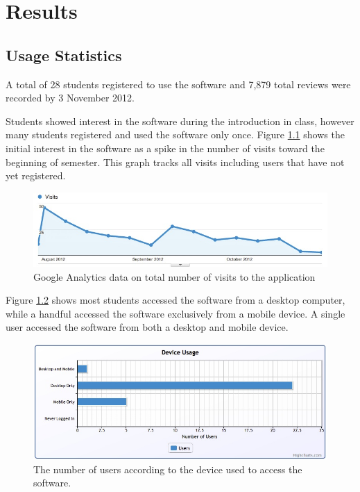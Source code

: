 \chapter{Results}

\section{Usage Statistics}

A total of 28 students registered to use the software and 7,879 total reviews were recorded
by 3 November 2012.

Students showed interest in the software during the introduction in class, however many
students registered and used the software only once. Figure \ref{fig_visits} shows the initial
interest in the software as a spike in the number of visits toward the beginning of semester.
This graph tracks all visits including users that have not yet registered.

\begin{figure}[h!]
\includegraphics[width=12cm]{img/visits.jpg}
\caption{Google Analytics data on total number of visits to the application}
\label{fig_visits}
\end{figure}

Figure \ref{fig_usage_devices} shows most students accessed the software from a
desktop computer, while a handful accessed the
software exclusively from a mobile device. A single user accessed the software from both
a desktop and mobile device.

\begin{figure}[h!]
\includegraphics[width=12cm]{img/usage_devices.jpg}
\caption{The number of users according to the device used to access the software.}
\label{fig_usage_devices}
\end{figure}

